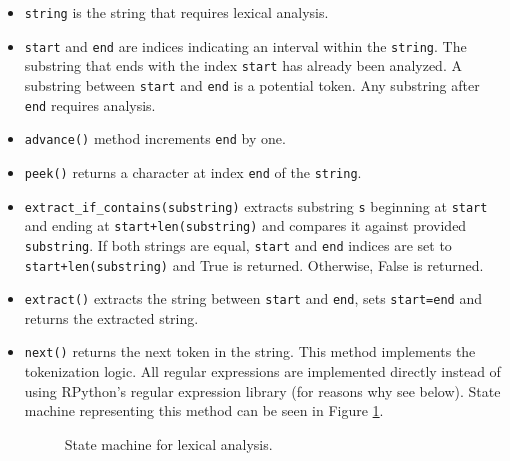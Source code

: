 \begin{itemize}
\item
\texttt{string} is the string that requires lexical analysis.

\item
\texttt{start} and \texttt{end} are indices indicating an interval within the \texttt{string}. The substring that ends with the index \texttt{start} has already been analyzed. A substring between \texttt{start} and \texttt{end} is a potential token. Any substring after \texttt{end} requires analysis.

\item
\texttt{advance()} method increments \texttt{end} by one.

\item
\texttt{peek()} returns a character at index \texttt{end} of the \texttt{string}.

\item
\texttt{extract\_if\_contains(substring)} extracts substring \texttt{s} beginning at \texttt{start} and ending at \texttt{start+len(substring)} and compares it against provided \texttt{substring}. If both strings are equal, \texttt{start} and \texttt{end} indices are set to \texttt{start+len(substring)} and True is returned. Otherwise, False is returned.

\item
\texttt{extract()} extracts the string between \texttt{start} and \texttt{end}, sets \texttt{start=end} and returns the extracted string.

\item
	\texttt{next()} returns the next token in the string. This method implements the tokenization logic. All regular expressions are implemented directly instead of using RPython's regular expression library (for reasons why see below). State machine representing this method can be seen in Figure \ref{lexical-analysis-tokenize}.

\begin{figure}[th!]
	\centering
\caption{State machine for lexical analysis.}
\label{lexical-analysis-tokenize}
\end{figure}


\end{itemize}
